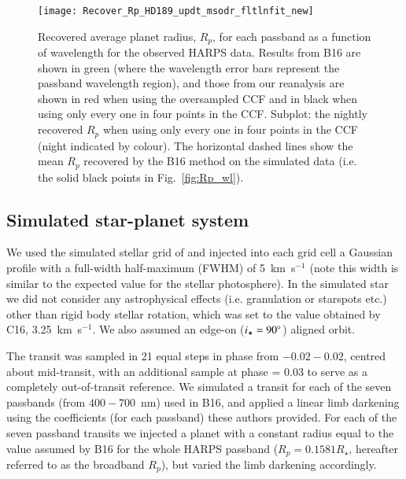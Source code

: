\documentclass{aa}
\begin{document}
\begin{center}
\begin{figure}[t!]
\centering
\texttt{[image: Recover\_Rp\_HD189\_updt\_msodr\_fltlnfit\_new]}
\caption[]{Recovered average planet radius, $R_p$, for each passband as a function of wavelength for the observed HARPS data. Results from B16 are shown in green (where the wavelength error bars represent the passband wavelength region), and those from our reanalysis are shown in red when using the oversampled CCF and in black when using only every one in four points in the CCF. Subplot: the nightly recovered $R_p$ when using only every one in four points in the CCF (night indicated by colour). The horizontal dashed lines show the mean $R_p$ recovered by the B16 method on the simulated data (i.e. the solid black points in Fig.~\ref{fig:Rp_wl}).
\vspace{-5pt}
} 
\label{fig:Rp_wl_data}
\end{figure}
\end{center}

\vspace{-40pt}
\subsection{Simulated star-planet system}
\label{sec:sim}
We used the simulated stellar grid of \cite{cegla15,cegla16a} and injected into each grid cell a Gaussian profile with a full-width half-maximum (FWHM) of 5~km~s$^{-1}$ (note this width is similar to the expected value for the stellar photosphere). In the simulated star we did not consider any astrophysical effects (i.e. granulation or starspots etc.) other than rigid body stellar rotation, which was set to the value obtained by C16, 3.25~km~s$^{-1}$. We also assumed an edge-on ($i_\star = 90 \degree$) aligned orbit. 

The transit was sampled in 21 equal steps in phase from $-0.02 - 0.02$, centred about mid-transit, with an additional sample at phase = 0.03 to serve as a completely out-of-transit reference. We simulated a transit for each of the seven passbands (from $400 - 700$~nm) used in B16, and applied a linear limb darkening using the coefficients (for each passband) these authors provided. For each of the seven passband transits we injected a planet with a constant radius equal to the value assumed by B16 for the whole HARPS passband ($R_p = 0.1581 R_{\star}$, hereafter referred to as the broadband $R_p$), but varied the limb darkening accordingly.
\end{document}
